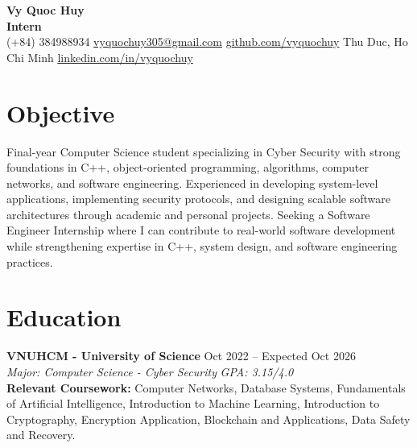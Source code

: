 \documentclass[10pt,a4paper]{article}
\begin{document}
\pagestyle{empty}

\begin{center}
    {\huge \textbf{Vy Quoc Huy}} \\ \vspace{4pt}
    {\Large \textbf{Intern}} \\ \vspace{4pt}
    (+84) 384988934 \quad \href{mailto:vyquochuy305@gmail.com}{vyquochuy305@gmail.com} \quad \href{https://github.com/vyquochuy}{github.com/vyquochuy} \quad Thu Duc, Ho Chi Minh \quad \href{https://www.linkedin.com/in/vyquochuy/}{linkedin.com/in/vyquochuy}
\end{center}

\section*{Objective}
Final-year Computer Science student specializing in Cyber Security with strong foundations in C++, object-oriented programming, algorithms, computer networks, and software engineering. Experienced in developing system-level applications, implementing security protocols, and designing scalable software architectures through academic and personal projects. Seeking a Software Engineer Internship where I can contribute to real-world software development while strengthening expertise in C++, system design, and software engineering practices.

\section*{Education}
\noindent \textbf{VNUHCM - University of Science} \hfill Oct 2022 -- Expected Oct 2026\\
\textit{Major: Computer Science - Cyber Security} \hfill \textit{GPA: 3.15/4.0}\\
\textbf{Relevant Coursework:} Computer Networks, Database Systems, Fundamentals of Artificial Intelligence, Introduction to Machine Learning, Introduction to Cryptography, Encryption Application, Blockchain and Applications, Data Safety and Recovery.

\end{document}
